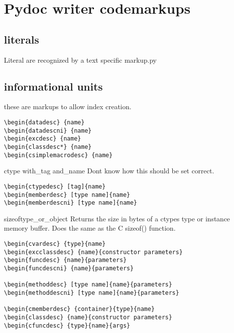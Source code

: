 \ifx\locallinewidth\undefined\newlength{\locallinewidth}\fi
\setlength{\locallinewidth}{\linewidth}


\section{Pydoc writer codemarkups\label{-pydoc-writer-codemarkups}}


\subsection{literals\label{-literals}}

Literal are recognized by a text specific markup.py


\subsection{informational units\label{-informational-units}}

these are markups to allow index creation.
\begin{verbatim}
\begin{datadesc} {name}
\begin{datadescni} {name}
\begin{excdesc} {name}
\begin{classdesc*} {name}
\begin{csimplemacrodesc} {name}
\end{verbatim}

\begin{ctypedesc}ctype with_tag and_name
Dont know how this should be set correct.
\end{ctypedesc}
\begin{verbatim}
\begin{ctypedesc} [tag]{name}
\begin{memberdesc} [type name]{name}
\begin{memberdescni} [type name]{name}
\end{verbatim}

\begin{funcdesc}{sizeof}{type_or_object}
Returns the size in bytes of a ctypes type or instance memory
buffer.  Does the same as the C sizeof() function.
\end{funcdesc}
\begin{verbatim}
\begin{cvardesc} {type}{name}
\begin{excclassdesc} {name}{constructor parameters}
\begin{funcdesc} {name}{parameters}
\begin{funcdescni} {name}{parameters}

\begin{methoddesc} [type name]{name}{parameters}
\begin{methoddescni} [type name]{name}{parameters}

\begin{cmemberdesc} {container}{type}{name}
\begin{classdesc} {name}{constructor parameters}
\begin{cfuncdesc} {type}{name}{args}
\end{verbatim}


